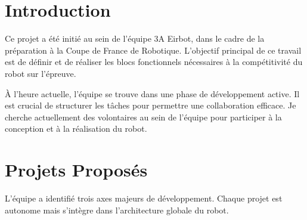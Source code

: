 \documentclass[a4paper,10pt]{article}
\begin{document}
\newpage

\tableofcontents

\newpage

\section{Introduction}

Ce projet a été initié au sein de l'équipe 3A Eirbot, dans le cadre de la préparation à la Coupe de France de Robotique. L'objectif principal de ce travail est de définir et de réaliser les blocs fonctionnels nécessaires à la compétitivité du robot sur l'épreuve.

À l'heure actuelle, l'équipe se trouve dans une phase de développement active. Il est crucial de structurer les tâches pour permettre une collaboration efficace. Je cherche actuellement des volontaires au sein de l'équipe pour participer à la conception et à la réalisation du robot.

\section{Projets Proposés}

L'équipe a identifié trois axes majeurs de développement. Chaque projet est autonome mais s'intègre dans l'architecture globale du robot.
\end{document}
